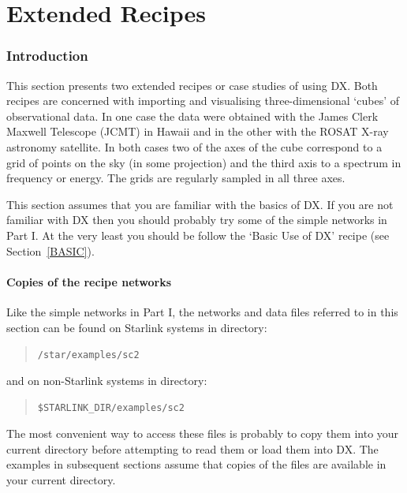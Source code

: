 \documentclass[twoside,11pt]{article}
\newcommand{\stardocinitials}  {SC}
\newcommand{\stardocnumber}    {2.3}
\newcommand{\stardocname}{\stardocinitials /\stardocnumber}
\newcommand{\xlabel}[1]{}
\begin{document}
\cleardoublepage
\markboth{\stardocname}{\stardocname}
\part{Extended Recipes}
\markboth{\stardocname}{\stardocname}
\section{\xlabel{INTRO_EXTEND}Introduction}

This section presents two extended recipes or case studies of using
DX.  Both recipes are concerned with importing and visualising
three-dimensional `cubes' of observational data.  In one case the data
were obtained with the James Clerk Maxwell Telescope (JCMT) in Hawaii
and in the other with the ROSAT X-ray astronomy satellite.  In both
cases two of the axes of the cube correspond to a grid of points on
the sky (in some projection) and the third axis to a spectrum in
frequency or energy.  The grids are regularly sampled in all three axes.

This section assumes that you are familiar with the basics of DX.  If
you are not familiar with DX then you should probably try some of
the simple networks in Part I.  At the very least you should be
follow the `Basic Use of DX' recipe (see Section~\ref{BASIC}).

\subsection{Copies of the recipe networks}

Like the simple networks in Part I, the networks and data files referred
to in this section can be found on Starlink systems in directory:

\begin{quote}
{\tt /star/examples/sc2}
\end{quote}

and on non-Starlink systems in directory:
\begin{quote}
{\tt \$STARLINK\_DIR/examples/sc2}
\end{quote}

The most convenient way to access these files is probably to copy them
into your current directory before attempting to read them or load
them into DX.  The examples in subsequent sections assume that copies
of the files are available in your current directory.
\end{document}
